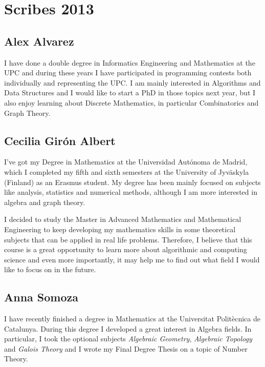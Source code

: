 \chapter*{Scribes 2013}

\setcounter{section}{0}

\section{Alex Alvarez}
I have done a double degree in Informatics Engineering and Mathematics at the UPC and during these years I have participated in programming contests both individually and representing the UPC. I am mainly interested in Algorithms and Data Structures and I would like to start a PhD in those topics next year, but I also enjoy learning about Discrete Mathematics, in particular Combinatorics and Graph Theory.


\section{Cecilia Gir\'on Albert}

I've got my Degree in Mathematics at the Universidad Aut\'onoma de Madrid, which I completed my fifth and sixth semesters 
at the University of Jyv\"askyla (Finland) as an Erasmus student. My degree has been mainly focused on subjects like 
analysis, statistics and numerical methods, although I am more interested in algebra and graph theory. 

I decided to study the Master in Advanced Mathematics and Mathematical Engineering to keep developing my mathematics skills 
in some theoretical subjects that can be applied in real life problems. Therefore, I believe that this course is a great 
opportunity to learn more about algorithmic and computing science and even more importantly, it may help me to find out 
what field I would like to focus on in the future.

\section{Anna Somoza}

I have recently finished a degree in Mathematics at the Universitat Polit\`ecnica de Catalunya. During this degree I developed a great interest in Algebra fields. In particular, I took the optional subjects \emph{Algebraic Geometry}, \emph{Algebraic Topology} and \emph{Galois Theory} and I wrote my Final Degree Thesis on a topic of Number Theory.


